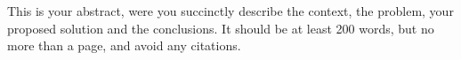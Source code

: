 This is your abstract, were you succinctly describe the context, the problem, your proposed solution and the conclusions.
It should be at least 200 words, but no more than a page, and avoid any citations.